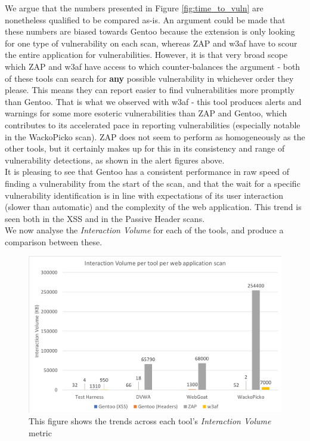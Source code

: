 We argue that the numbers presented in Figure \ref{fig:time_to_vuln} are nonetheless qualified to be compared as-is. An argument could be made that these numbers are biased towards Gentoo because the extension is only looking for one type of vulnerability on each scan, whereas ZAP and w3af have to scour the entire application for vulnerabilities. However, it is that very broad scope which ZAP and w3af have access to which counter-balances the argument - both of these tools can search for \textbf{any} possible vulnerability in whichever order they please. This means they can report easier to find vulnerabilities more promptly than Gentoo. That is what we observed with w3af - this tool produces alerts and warnings for some more esoteric vulnerabilities than ZAP and Gentoo, which contributes to its accelerated pace in reporting vulnerabilities (especially notable in the WackoPicko scan). ZAP does not seem to perform as homogeneously as the other tools, but it certainly makes up for this in its consistency and range of vulnerability detections, as shown in the alert figures above. \\

It is pleasing to see that Gentoo has a consistent performance in raw speed of finding a vulnerability from the start of the scan, and that the wait for a specific vulnerability identification is in line with expectations of its user interaction (slower than automatic) and the complexity of the web application. This trend is seen both in the XSS and in the Passive Header scans. \\

We now analyse the \textit{Interaction Volume} for each of the tools, and produce a comparison between these. \\

\begin{figure}[h]
	\centering
	\includegraphics[width=\textwidth]{images/evaluation/interaction_to_volume.png}
	\caption{This figure shows the trends across each tool's \textit{Interaction Volume} metric}
	\label{fig:interaction_volume}
\end{figure}

